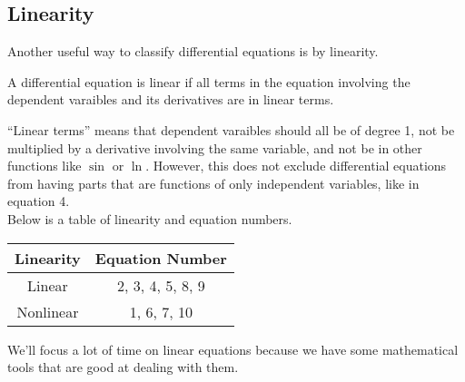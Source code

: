 \subsection{Linearity}
\noindent
Another useful way to classify differential equations is by linearity.
\begin{definition}
	A differential equation is linear if all terms in the equation involving the dependent varaibles and its derivatives are in linear terms.
\end{definition}
\noindent
``Linear terms'' means that dependent varaibles should all be of degree 1, not be multiplied by a derivative involving the same variable, and not be in other functions like $\sin$ or $\ln$. However, this does not exclude differential equations from having parts that are functions of only independent variables, like in equation 4.\\

\noindent
Below is a table of linearity and equation numbers.
\begin{table}[H]
	\centering
	\begin{tabular}{c|c}
		Linearity & Equation Number \\
		\hline
		Linear &  2, 3, 4, 5, 8, 9 \\
		Nonlinear & 1, 6, 7, 10 \\
	\end{tabular}
\end{table}
\noindent
We'll focus a lot of time on linear equations because we have some mathematical tools that are good at dealing with them.